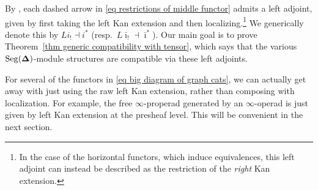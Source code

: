 \documentclass{amsart}
\numberwithin{theorem}{subsection}
\theoremstyle{definition}
\newcommand{\name}[1]{\ensuremath{\text{\textup{#1}}}}
\newcommand{\simp}{\mathbf{\Delta}}
\newcommand{\barishriek}{\bar \imath_!}
\newcommand{\bariustar}{\bar \imath^*}
\newcommand{\Seg}{\name{Seg}}
\begin{document}
By \cite[Proposition 4.7]{patterns1}, each dashed arrow in \eqref{eq restrictions of middle functor} admits a left adjoint, given by first taking the left Kan extension and then localizing.\footnote{In the case of the horizontal functors, which induce equivalences, this left adjoint can instead be described as the restriction of the \emph{right} Kan extension.}
We generically denote this by $Li_! \dashv i^*$ (resp.\ $L\barishriek \dashv \bariustar$).
Our main goal is to prove Theorem~\ref{thm generic compatibility with tensor}, which says that the various $\Seg(\simp)$-module structures are compatible via these left adjoints.

For several of the functors in \eqref{eq big diagram of graph cats}, we can actually get away with just using the raw left Kan extension, rather than composing with localization.
For example, the free $\infty$-properad generated by an $\infty$-operad is just given by left Kan extension at the presheaf level.
This will be convenient in the next section.
\end{document}
